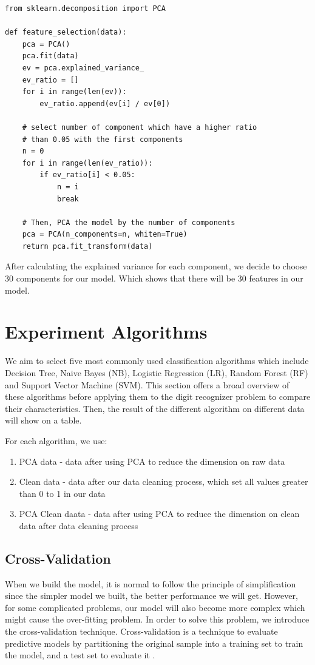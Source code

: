 \documentclass[sigconf]{acmart}
\begin{document}
\begin{lstlisting}
from sklearn.decomposition import PCA

def feature_selection(data):
    pca = PCA()
    pca.fit(data)
    ev = pca.explained_variance_
    ev_ratio = []
    for i in range(len(ev)):
        ev_ratio.append(ev[i] / ev[0])

    # select number of component which have a higher ratio
    # than 0.05 with the first components
    n = 0
    for i in range(len(ev_ratio)):
        if ev_ratio[i] < 0.05:
            n = i
            break

    # Then, PCA the model by the number of components
    pca = PCA(n_components=n, whiten=True)
    return pca.fit_transform(data)
\end{lstlisting}

After calculating the explained variance for each component, we decide to choose 30 components for our model. Which shows that there will be 30 features in our model.

\section{Experiment Algorithms}

We aim to select five most commonly used classification algorithms which include Decision Tree, Naive Bayes (NB), Logistic Regression (LR), Random Forest (RF) and Support Vector Machine (SVM). This section offers a broad overview of these algorithms before applying them to the digit recognizer problem to compare their characteristics. Then, the result of the different algorithm on different data will show on a table.

For each algorithm, we use:
\begin{enumerate}
    \item PCA data - data after using PCA to reduce the dimension on raw data
    \item Clean data - data after our data cleaning process, which set all values greater than 0 to 1 in our data
    \item PCA Clean daata - data after using PCA to reduce the dimension on clean data after data cleaning process
\end{enumerate}

\subsection{Cross-Validation}

When we build the model, it is normal to follow the principle of simplification since the simpler model we built, the better performance we will get. However, for some complicated problems, our model will also become more complex which might cause the over-fitting problem. In order to solve this problem, we introduce the cross-validation technique. Cross-validation is a technique to evaluate predictive models by partitioning the original sample into a training set to train the model, and a test set to evaluate it \cite{10f.cv}.
\end{document}
